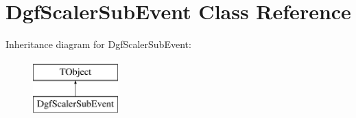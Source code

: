\hypertarget{class_dgf_scaler_sub_event}{}\section{Dgf\+Scaler\+Sub\+Event Class Reference}
\label{class_dgf_scaler_sub_event}
Inheritance diagram for Dgf\+Scaler\+Sub\+Event\+:\begin{figure}[H]
\begin{center}
\leavevmode
\includegraphics[height=2.000000cm]{class_dgf_scaler_sub_event}
\end{center}
\end{figure}
